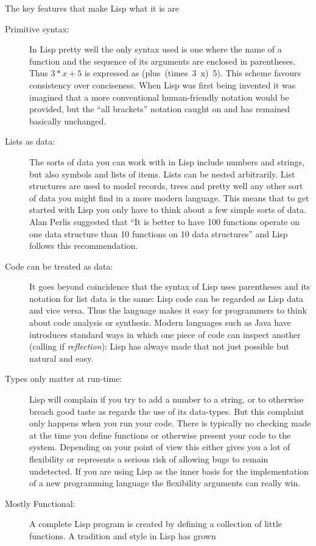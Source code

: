 The key features that make Lisp what it is are
\begin{description}
\item[Primitive syntax:] In Lisp pretty well the only syntax used is
one where the name of a function and the sequence of its arguments are
enclosed in parentheses. Thus $3*x + 5$ is expressed as
{\tx (plus~(times~3~x)~5)}. This scheme favours consistency over
conciseness. When Lisp was first being invented it was imagined that
a more conventional human-friendly notation would be provided, but the
``all brackets'' notation caught on and has remained basically
unchanged.
\item[Lists as data:] The sorts of data you can work with in Lisp include
numbers and strings, but also symbols and lists of items. Lists can be nested
arbitrarily. List structures are used to model records, trees and pretty
well any other sort of data you might find in a more modern language. This
means that to get started with Lisp you only have to think about a few simple
sorts of data. Alan Perlis\cite{perlis} suggested that ``It is better to have 100
functions operate on one data structure than 10 functions on 10
data structures'' and Lisp follows this recommendation.
\item[Code can be treated as data:] It goes beyond coincidence that the syntax
of Lisp uses parentheses and its notation for list data is the same: Lisp code
can be regarded as Lisp data and vice versa. Thus the language makes it
easy for programmers to think about code analysis or synthesis. Modern
languages such as Java have introduces standard ways in which one piece
of code can inspect another (calling if {\em reflection}): Lisp has
always made that not just possible but natural and easy.
\item[Types only matter at run-time:] Lisp will complain if you try to
add a number to a string, or to otherwise breach good taste as regards the
use of its data-types. But this complaint only happens when you run your code.
There is typically no checking made at the time you define functions or
otherwise present your code to the system. Depending on your point of view
this either gives you a lot of flexibility or represents a serious risk of
allowing bugs to remain undetected. If you are using Lisp as the inner basis
for the implementation of a new programming language the flexibility
arguments can really win.
\item[Mostly Functional:] A complete Lisp program is created by defining
a collection of little functions. A tradition and style in Lisp has grown

\end{description}
